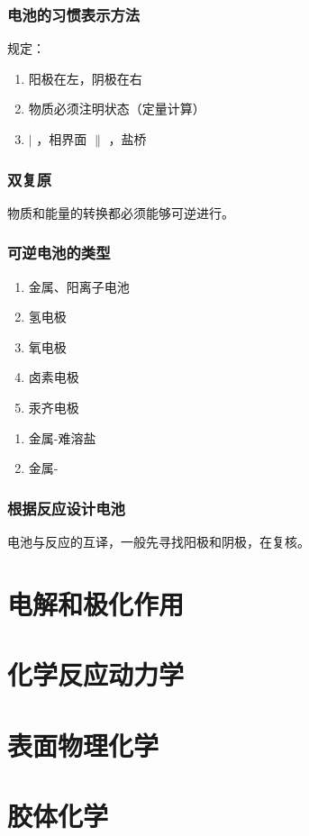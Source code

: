 \documentclass[a4paper]{ctexrep}
\begin{document}
    \subsection{电池的习惯表示方法}

    规定：

    \begin{enumerate}
        \item 阳极在左，阴极在右
        \item 物质必须注明状态（定量计算）
        \item $\vert$ ，相界面 $\|$ ，盐桥
    \end{enumerate}

    \subsection{双复原}

    物质和能量的转换都必须能够可逆进行。

    \subsection{可逆电池的类型}

    \begin{enumerate}
        \item 金属、阳离子电池
        \item 氢电极
        \item 氧电极
        \item 卤素电极
        \item 汞齐电极
    \end{enumerate}

    \begin{enumerate}
        \item 金属-难溶盐
        \item 金属-
    \end{enumerate}



    \subsection{根据反应设计电池}

    电池与反应的互译，一般先寻找阳极和阴极，在复核。

    \chapter{电解和极化作用}

    \chapter{化学反应动力学}

    \chapter{表面物理化学}

    \chapter{胶体化学}
\end{document}
